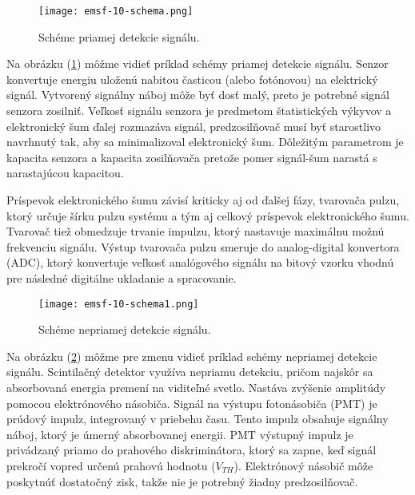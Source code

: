 \documentclass[../../main.tex]{subfiles}
\begin{document}
\begin{figure}[!h]
\texttt{[image: emsf-10-schema.png]}
\centering
\caption{Schéme priamej detekcie signálu.}
\label{em10:fig:priamaschema}
\end{figure}

Na obrázku (\ref{em10:fig:priamaschema}) môžme vidieť príklad schémy priamej detekcie signálu. Senzor konvertuje energiu uloženú nabitou časticou (alebo fotónovou) na elektrický signál. Vytvorený signálny náboj môže byť dosť malý, preto je potrebné signál senzora zosilniť. Veľkosť signálu senzora je predmetom štatistických výkyvov a elektronický šum ďalej rozmazáva signál, predzosilňovač musí byť starostlivo navrhnutý tak, aby sa minimalizoval elektronický šum. Dôležitým parametrom je kapacita senzora a kapacita zosilňovača pretože pomer signál-šum narastá s narastajúcou kapacitou. 

Príspevok elektronického šumu závisí kriticky aj od ďalšej fázy, tvarovača pulzu, ktorý určuje šírku pulzu systému a tým aj celkový príspevok elektronického šumu. Tvarovač tiež obmedzuje trvanie impulzu, ktorý nastavuje maximálnu možnú frekvenciu signálu. Výstup tvarovača pulzu smeruje do analog-digital konvertora (ADC), ktorý konvertuje veľkosť analógového signálu na bitový vzorku vhodnú pre následné digitálne ukladanie a spracovanie.

\begin{figure}[!h]
\texttt{[image: emsf-10-schema1.png]}
\centering
\caption{Schéme nepriamej detekcie signálu.}
\label{em10:fig:nepriamaschema}
\end{figure}

Na obrázku (\ref{em10:fig:nepriamaschema}) môžme pre zmenu vidieť príklad schémy nepriamej detekcie signálu. Scintilačný detektor využíva nepriamu detekciu, pričom najskôr sa absorbovaná energia premení na viditeľné svetlo. Nastáva zvýšenie amplitúdy pomocou elektrónového násobiča. Signál na výstupu fotonásobiča (PMT) je prúdový impulz, integrovaný v priebehu času. Tento impulz obsahuje signálny náboj, ktorý je úmerný absorbovanej energii. PMT výstupný impulz je privádzaný priamo do prahového diskriminátora, ktorý sa zapne, keď signál prekročí vopred určenú prahovú hodnotu ($V_{TH}$). Elektrónový násobič môže poskytnúť dostatočný zisk, takže nie je potrebný žiadny predzosilňovač.
\end{document}
